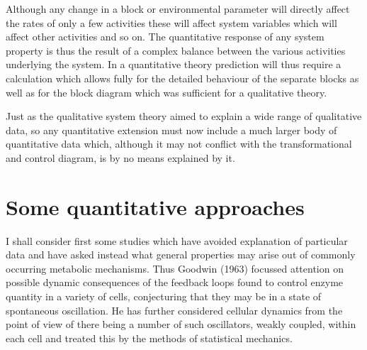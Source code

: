 Although any change in a block or environmental parameter will directly affect the rates of only a few activities these will affect system variables which will affect other activities and so on. The quantitative response of any system property is thus the result of a complex balance between the various activities underlying the system. In a quantitative theory prediction will thus require a calculation which allows fully for the detailed behaviour of the separate blocks as well as for the block diagram which was sufficient for a qualitative theory.

Just as the qualitative system theory aimed to explain a wide range of qualitative data, so any quantitative extension must now include a much larger body of quantitative data which, although it may not conflict with the transformational and control diagram, is by no means explained by it.

\section{Some quantitative approaches}

I shall consider first some studies which have avoided explanation of particular data and have asked instead what general properties may arise out of commonly occurring metabolic mechanisms. Thus Goodwin (1963) focussed attention on possible dynamic consequences of the feedback loops found to control enzyme quantity in a variety of cells, conjecturing that they may be in a state of spontaneous oscillation. He has further considered cellular dynamics from the point of view of there being a number of such oscillators, weakly coupled, within each cell and treated this by the methods of statistical mechanics.


